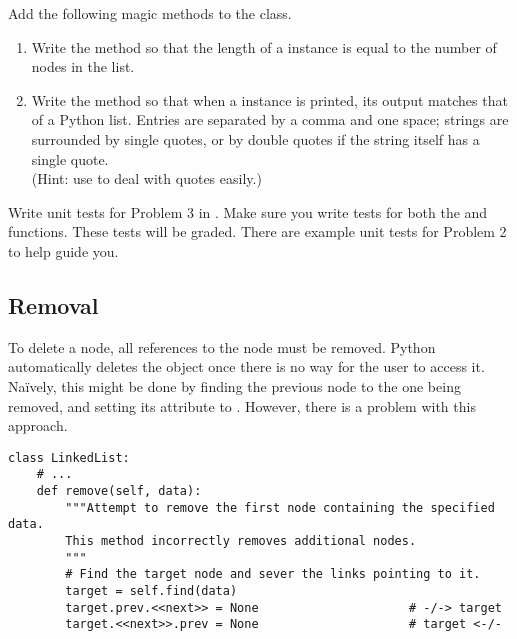 \begin{problem} %
Add the following magic methods to the  class.
\begin{enumerate}
\item Write the  method so that the length of a  instance is equal to the number of nodes in the list.

\item Write the  method so that when a  instance is printed, its output matches that of a Python list.
Entries are separated by a comma and one space; strings are surrounded by single quotes, or by double quotes if the string itself has a single quote.
\\(Hint: use  to deal with quotes easily.)
\end{enumerate}
\end{problem}

\begin{unittest}
Write unit tests for Problem 3 in .
Make sure you write tests for both the   and  functions.
These tests will be graded.
There are example unit tests for Problem 2 to help guide you. 
\end{unittest}

\subsection*{Removal} %

To delete a node, all references to the node must be removed.
Python automatically deletes the object once there is no way for the user to access it.
Na{\"i}vely, this might be done by finding the previous node to the one being removed, and setting its  attribute to .
However, there is a problem with this approach.

\begin{lstlisting}
class LinkedList:
    # ...
    def remove(self, data):
        """Attempt to remove the first node containing the specified data.
        This method incorrectly removes additional nodes.
        """
        # Find the target node and sever the links pointing to it.
        target = self.find(data)
        target.prev.<<next>> = None                     # -/-> target
        target.<<next>>.prev = None                     # target <-/-
\end{lstlisting}


